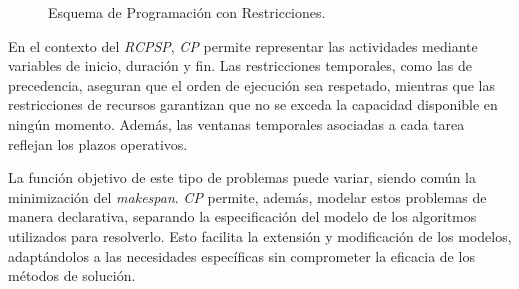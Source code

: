 \documentclass{article}
\begin{document}
\begin{figure}[htbp]
\centering
{}
\caption{Esquema de Programación con Restricciones.}
\label{fig:constraint_programming}
\end{figure}

En el contexto del \textit{RCPSP}, \textit{CP} permite representar las actividades mediante variables de inicio, duración y fin. Las restricciones temporales, como las de precedencia, aseguran que el orden de ejecución sea respetado, mientras que las restricciones de recursos garantizan que no se exceda la capacidad disponible en ningún momento. Además, las ventanas temporales asociadas a cada tarea reflejan los plazos operativos.

La función objetivo de este tipo de problemas puede variar, siendo común la minimización del \textit{makespan}. \textit{CP} permite, además, modelar estos problemas de manera declarativa, separando la especificación del modelo de los algoritmos utilizados para resolverlo. Esto facilita la extensión y modificación de los modelos, adaptándolos a las necesidades específicas sin comprometer la eficacia de los métodos de solución.


\end{document}
